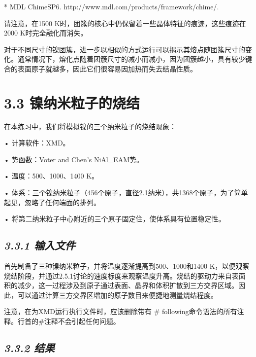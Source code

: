 * MDL ChimeSP6. http://www.mdl.com/products/framework/chime/.

请注意，在1500
K时，团簇的核心中仍保留着一些晶体特征的痕迹，这些痕迹在2000
K时完全融化而消失。

对于不同尺寸的镍团簇，进一步以相似的方式运行可以揭示其熔点随团簇尺寸的变化。通常情况下，熔化点随着团簇尺寸的减小而减小，因为团簇越小，具有较少键合的表面原子就越多，因此它们很容易因加热而失去结晶性质。

\hypertarget{ux954dux7eb3ux7c73ux7c92ux5b50ux7684ux70e7ux7ed3}{%
\section{3.3
镍纳米粒子的烧结}\label{ux954dux7eb3ux7c73ux7c92ux5b50ux7684ux70e7ux7ed3}}

在本练习中，我们将模拟镍的三个纳米粒子的烧结现象：

• 计算软件：XMD。

• 势函数：Voter and Chen's NiAl\_EAM势。

• 温度：500、1000、1400 K。

•
体系：三个镍纳米粒子（456个原子，直径2.1纳米），共1368个原子，为了简单起见，忽略了任何端面的排列。

• 将第二纳米粒子中心附近的三个原子固定住，使体系具有位置稳定性。

\hypertarget{ux8f93ux5165ux6587ux4ef6-1}{%
\subsection{\texorpdfstring{\emph{3.3.1
输入文件}}{3.3.1 输入文件}}\label{ux8f93ux5165ux6587ux4ef6-1}}

首先制备了三种镍纳米粒子，并将温度逐渐提高到500、1000和1400
K，以便观察烧结阶段，并通过2.5.1讨论的速度标度来观察温度升高。烧结的驱动力来自表面积的减少，这一过程涉及到原子通过表面、晶界和体积扩散到三方交界区域。因此，可以通过计算三方交界区增加的原子数目来便捷地测量烧结程度。




注意，在为XMD运行执行文件时，应该删除带有 \#
following命令语法的所有注释。行首的\#注释不会引起任何问题。

\hypertarget{ux7ed3ux679c-2}{%
\subsection{\texorpdfstring{\emph{3.3.2
结果}}{3.3.2 结果}}\label{ux7ed3ux679c-2}}

